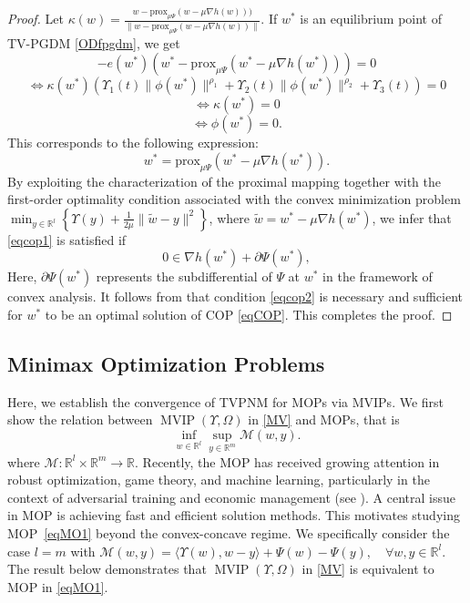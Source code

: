 \documentclass{article}
\theoremstyle{plain}%
\theoremstyle{thmstyletwo}%
\theoremstyle{thmstylethree}%
\begin{document}
\begin{proof}
Let $\kappa(w) = \frac{w - \text{prox}_{\mu \Psi}(w - \mu \nabla h(w)))}{\|w - \text{prox}_{\mu \Psi}(w - \mu \nabla h(w))\|}$. If $w^*$ is an equilibrium point of TV-PGDM \eqref{ODfpgdm}, we get
\[
- e(w^*) (w^* - \text{prox}_{\mu \Psi}(w^* - \mu \nabla h(w^*))) = 0
\]
\[
\Leftrightarrow \kappa(w^*) (\Upsilon_1(t) \|\phi(w^*)\|^{\rho_1} + \Upsilon_2(t) \|\phi(w^*)\|^{\rho_2} + \Upsilon_3(t)) = 0
\]
\[
\Leftrightarrow \kappa(w^*) = 0\]
\[\Leftrightarrow \phi(w^*) = 0.
\]
This corresponds to the following expression:
\begin{equation}\label{eqcop1}
w^* = \text{prox}_{\mu \Psi}(w^* - \mu \nabla h(w^*)).
\end{equation}
By exploiting the characterization of the proximal mapping together with the first-order optimality condition associated with the convex minimization problem
$\min_{y\in\mathbb{R}^l}\left\{\Upsilon(y)+\frac{1}{2\mu}\|\tilde{w}-y\|^{2}\right\}$, where $\tilde{w}=w^*-\mu\nabla h(w^*)$,
we infer that \eqref{eqcop1} is satisfied if
\begin{equation}\label{eqcop2}
0 \in \nabla h(w^*) + \partial \Psi(w^*),
\end{equation}
Here, $\partial \Psi(w^*)$ represents the subdifferential of $\Psi$ at $w^*$ in the framework of convex analysis. It follows from \cite{29} that condition \eqref{eqcop2} is necessary and sufficient for $w^*$ to be an optimal solution of COP \eqref{eqCOP}. This completes the proof.
\end{proof}

\subsection{Minimax Optimization Problems}
Here, we establish the convergence of TVPNM for MOPs via MVIPs. We first show the relation between $\operatorname{MVIP}(\Upsilon,\Omega)$ in \eqref{MV} and MOPs, that is
\begin{equation}\label{eqMO1}
    \inf_{w\in \mathbb{R}^l} \sup_{y \in \mathbb{R}^m} \mathcal{M}(w,y).
\end{equation}
where $\mathcal{M} : \mathbb{R}^l \times \mathbb{R}^m \to \mathbb{R}$. Recently, the MOP has received growing attention in robust optimization, game theory, and machine learning, particularly in the context of adversarial training and economic management (see \cite{30}). A central issue in MOP is achieving fast and efficient solution methods. This motivates studying MOP~\eqref{eqMO1} beyond the convex-concave regime. We specifically consider the case $l=m$ with
\(
\mathcal{M}(w,y)=\langle \Upsilon(w),w-y\rangle+\Psi(w)-\Psi(y), \quad\forall w,y\in\mathbb{R}^l.
\) The result below demonstrates that $\operatorname{MVIP}(\Upsilon, \Omega)$ in \eqref{MV} is equivalent to MOP in \eqref{eqMO1}.\\
\end{document}
